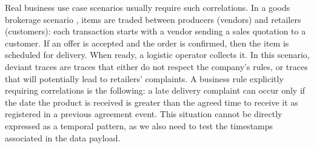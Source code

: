 Real business use case scenarios usually require such correlations. In a goods brokerage scenario \cite{PetermannJMR14},  items are traded between producers (vendors) and retailers (customers): each transaction starts with a vendor sending a sales quotation to a customer. If an offer is accepted and the order is confirmed, then the item is scheduled for delivery. When ready, a logistic operator collects it. %
In this scenario, deviant traces are traces that either do not respect the company's rules, or traces that will potentially lead to retailers' complaints. %
A business rule explicitly requiring correlations is the following:   a late delivery complaint can occur only if the date the product is received is greater than the agreed time to receive it as registered in a previous agreement event. This situation cannot be directly expressed as a temporal pattern, as we also need to test the timestamps associated in the data payload. %



